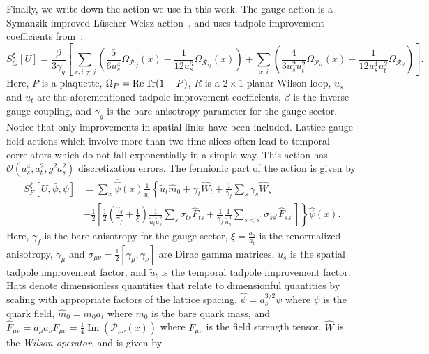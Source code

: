 Finally, we write down the action we use in this work. The gauge action is a Symanzik-improved L\"uscher-Weisz action~\cite{Luscher:1984xn,Luscher:1985zq}, and uses tadpole improvement coefficients from~\cite{Morningstar:1997ff, Morningstar:1999rf, Lin:2008pr,Edwards:2008ja}:
\begin{equation}
    S_{G}^{\xi}[U]=\frac{\beta}{3 \gamma_{g}}\left[\sum_{x, i \neq j}\left(\frac{5}{6 u_{s}^{4}} \Omega_{\mathcal{P}_{i j}}(x)-\frac{1}{12 u_{s}^{6}} \Omega_{\mathcal{R}_{i j}}(x)\right)+\sum_{x, i}\left(\frac{4}{3 u_{s}^{2} u_{t}^{2}} \Omega_{\mathcal{P}_{i t}}(x)-\frac{1}{12 u_{s}^{4} u_{t}^{2}} \Omega_{\mathcal{R}_{i t}}\right)\right].
\end{equation}
Here, $P$ is a plaquette, $\Omega_P = \Re \Tr(1-P)$, $R$ is a $2\times 1$ planar Wilson loop, $u_s$ and $u_t$ are the aforementioned tadpole improvement coefficients, $\beta$ is the inverse gauge coupling, and $\gamma_g$ is the bare anisotropy parameter for the gauge sector. Notice that only improvements in spatial links have been included. Lattice gauge-field actions which involve more than two time slices often lead to temporal correlators which do not fall exponentially in a simple way. This action has $\mathcal O(a_s^4, a_t^2, g^2a_s^2)$ discretization errors. The fermionic part of the action is given by
\begin{equation}
    \begin{aligned}
        S_{F}^{\xi}[U, \bar{\psi}, \psi] &=\sum_{x} \overline{\hat{\psi}}(x) \frac{1}{\tilde{u}_{t}}\left\{\tilde{u}_{t} \hat{m}_{0}+\gamma_{t} \hat{W}_{t}+\frac{1}{\gamma_{f}} \sum_{s} \gamma_{s} \hat{W}_{s}\right.\\
        &\left.-\frac{1}{2}\left[\frac{1}{2}\left(\frac{\gamma_{g}}{\gamma_{f}}+\frac{1}{\xi}\right) \frac{1}{\tilde{u}_{t} \tilde{u}_{s}^{2}} \sum_{s} \sigma_{t s} \hat{F}_{t s}+\frac{1}{\gamma_{f}} \frac{1}{\tilde{u}_{s}^{3}} \sum_{s<s^{\prime}} \sigma_{s s^{\prime}} \hat{F}_{s s^{\prime}}\right]\right\} \hat{\psi}(x).
        \end{aligned}
\end{equation}
Here, $\gamma_f$ is the bare anisotropy for the gauge sector, $\xi = \frac{a_s}{a_t}$ is the renormalized anisotropy, $\gamma_\mu$ and $\sigma_{\mu\nu} = \frac{1}{2}[\gamma_\mu, \gamma_\nu]$ are Dirac gamma matrices, $\tilde u_s$ is the spatial tadpole improvement factor, and $\tilde u_t$ is the temporal tadpole improvement factor. Hats denote dimensionless quantities that relate to dimensionful quantities by scaling with appropriate factors of the lattice spacing. $\hat{\psi}=a_{s}^{3 / 2} \psi$ where $\psi$ is the quark field, $\hat{m}_{0}=m_{0} a_{t}$ where $m_0$ is the bare quark mass, and $\hat{F}_{\mu \nu}=a_{\mu} a_{\nu} F_{\mu \nu}=\frac{1}{4} \operatorname{Im}\left(\mathcal{P}_{\mu \nu}(x)\right)$ where $F_{\mu\nu}$ is the field strength tensor. $\hat W$ is the \emph{Wilson operator}, and is given by
